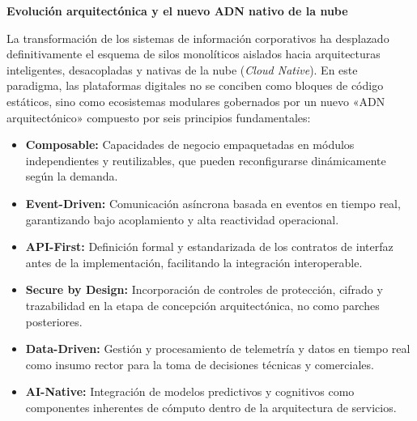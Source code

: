 \par\textbf{\textcolor{unabblue}{}\quad Evolución arquitectónica y el nuevo ADN nativo de la nube}\par
La transformación de los sistemas de información corporativos ha desplazado definitivamente el esquema de silos monolíticos aislados hacia arquitecturas inteligentes, desacopladas y nativas de la nube (\textit{Cloud Native}). En este paradigma, las plataformas digitales no se conciben como bloques de código estáticos, sino como ecosistemas modulares gobernados por un nuevo «ADN arquitectónico» compuesto por seis principios fundamentales:
\begin{itemize}
  \item \textbf{Composable:} Capacidades de negocio empaquetadas en módulos independientes y reutilizables, que pueden reconfigurarse dinámicamente según la demanda.
  \item \textbf{Event-Driven:} Comunicación asíncrona basada en eventos en tiempo real, garantizando bajo acoplamiento y alta reactividad operacional.
  \item \textbf{API-First:} Definición formal y estandarizada de los contratos de interfaz antes de la implementación, facilitando la integración interoperable.
  \item \textbf{Secure by Design:} Incorporación de controles de protección, cifrado y trazabilidad en la etapa de concepción arquitectónica, no como parches posteriores.
  \item \textbf{Data-Driven:} Gestión y procesamiento de telemetría y datos en tiempo real como insumo rector para la toma de decisiones técnicas y comerciales.
  \item \textbf{AI-Native:} Integración de modelos predictivos y cognitivos como componentes inherentes de cómputo dentro de la arquitectura de servicios.
\end{itemize}

